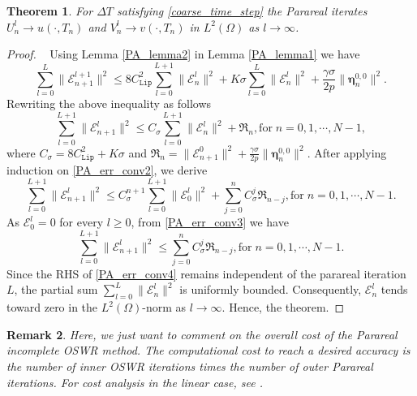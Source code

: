 \documentclass[11pt]{article}
\newtheorem{theorem}{Theorem}[section]
\newtheorem{remark}[theorem]{Remark}
\begin{document}
\begin{theorem}
For $\Delta T$ satisfying \eqref{coarse_time_step} the Parareal iterates $U_n^l\rightarrow u(\cdot, T_n)$ and $ V_n^l \rightarrow v(\cdot, T_n)$ in $L^2(\Omega)$ as $l\rightarrow\infty$.
\end{theorem}
\begin{proof}~
Using Lemma \ref{PA_lemma2} in Lemma \ref{PA_lemma1} we have
\begin{equation}\label{PA_err_conv}
\sum_{l=0}^{L} \parallel \mathcal{E}_{n+1}^{l+1}\parallel^2 \leq 8C_{\texttt{Lip}}^2 \sum_{l=0}^{L+1}  \parallel \mathcal{E}_{n}^{l}\parallel^2  + K\sigma \sum_{l=0}^L \parallel \mathcal{E}_{n}^{l}\parallel^2  +\frac{\gamma\sigma}{2p} \parallel\boldsymbol{\eta}_n^{0,0}\parallel^2.
\end{equation} 
Rewriting the above inequality as follows
\begin{equation}\label{PA_err_conv2}
\sum_{l=0}^{L+1} \parallel \mathcal{E}_{n+1}^{l}\parallel^2 \leq C_{\sigma} \sum_{l=0}^{L+1}  \parallel \mathcal{E}_{n}^{l}\parallel^2 + \mathfrak{R}_n, \text{for}\; n=0,1,\cdots, N-1,
\end{equation}
where $C_{\sigma}=8C_{\texttt{Lip}}^2 + K\sigma$ and $\mathfrak{R}_n = \parallel \mathcal{E}_{n+1}^{0}\parallel^2+\frac{\gamma\sigma}{2p} \parallel\boldsymbol{\eta}_n^{0,0}\parallel^2$.
After applying induction on \eqref{PA_err_conv2}, we derive
\begin{equation}\label{PA_err_conv3}
\sum_{l=0}^{L+1} \parallel \mathcal{E}_{n+1}^{l}\parallel^2 \leq C_{\sigma}^{n+1} \sum_{l=0}^{L+1}  \parallel \mathcal{E}_{0}^{l}\parallel^2 + \sum_{j=0}^n C_{\sigma}^{j} \mathfrak{R}_{n-j}, \text{for}\; n=0,1,\cdots, N-1.
\end{equation}
As $\mathcal{E}_{0}^{l}=0$ for every $l\geq 0$, from \eqref{PA_err_conv3} we have 
\begin{equation}\label{PA_err_conv4}
\sum_{l=0}^{L+1} \parallel \mathcal{E}_{n+1}^{l}\parallel^2 \leq \sum_{j=0}^n C_{\sigma}^{j} \mathfrak{R}_{n-j}, \text{for}\; n=0,1,\cdots, N-1.
\end{equation}
Since the RHS of \eqref{PA_err_conv4} remains independent of the parareal iteration $L$, the partial sum $\sum_{l=0}^{L} \parallel \mathcal{E}_{n}^{l}\parallel^2$ is uniformly bounded. Consequently, $\mathcal{E}_{n}^{l}$ tends toward zero in the $L^2(\Omega)$-norm as $l\rightarrow\infty$. Hence, the theorem.
\end{proof}
\begin{remark}
     Here, we just want to comment on the overall cost of the Parareal incomplete OSWR method. The computational cost to reach a desired accuracy is the number of inner OSWR iterations times the number of outer Parareal iterations. For cost analysis in the linear case, see \cite{bui2022coupling}.
\end{remark}
\end{document}
